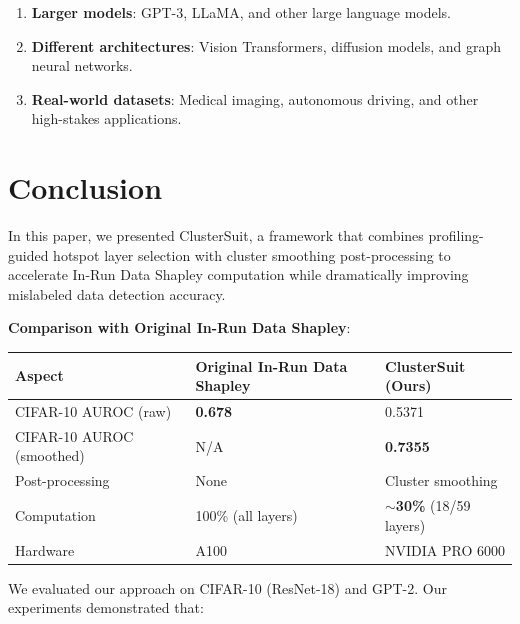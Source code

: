 \documentclass[12pt,a4paper]{report}
\begin{document}
\begin{enumerate}
    \item \textbf{Larger models}: GPT-3, LLaMA, and other large language models.
    \item \textbf{Different architectures}: Vision Transformers, diffusion models, and graph neural networks.
    \item \textbf{Real-world datasets}: Medical imaging, autonomous driving, and other high-stakes applications.
\end{enumerate}

\section{Conclusion}
\label{sec:conclusion}

In this paper, we presented ClusterSuit, a framework that combines profiling-guided hotspot layer selection with cluster smoothing post-processing to accelerate In-Run Data Shapley computation while dramatically improving mislabeled data detection accuracy.

\bigskip
\noindent \textbf{Comparison with Original In-Run Data Shapley}:

\begin{table}[htbp]
    \centering
    \begin{tabular}{lll}
        \toprule
        \textbf{Aspect} & \textbf{Original In-Run Data Shapley} & \textbf{ClusterSuit (Ours)} \\
        \midrule
        CIFAR-10 AUROC (raw) & \textbf{0.678} & 0.5371 \\
        CIFAR-10 AUROC (smoothed) & N/A & \textbf{0.7355} \\
        Post-processing & None & Cluster smoothing \\
        Computation & 100\% (all layers) & \textbf{$\sim$30\%} (18/59 layers) \\
        Hardware & A100 & NVIDIA PRO 6000 \\
        \bottomrule
    \end{tabular}
    \label{tab:conclusion_comparison}
\end{table}

\bigskip
We evaluated our approach on CIFAR-10 (ResNet-18) and GPT-2. Our experiments demonstrated that:
\end{document}
